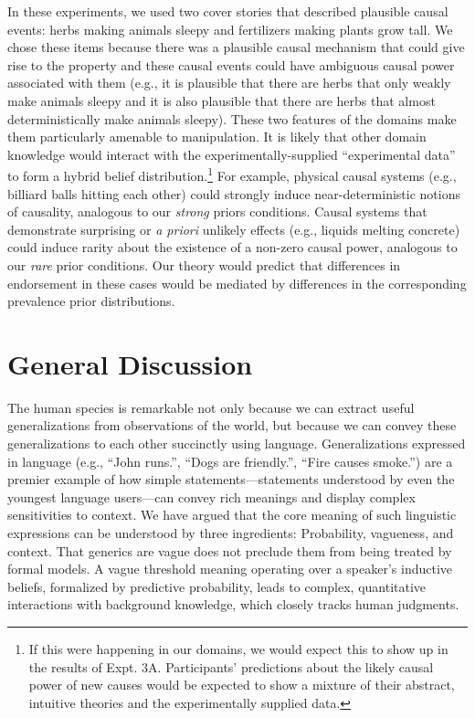 \documentclass[english,,man,floatsintext]{apa6}
\let\rmarkdownfootnote\footnote%
\def\footnote{\protect\rmarkdownfootnote}
\theoremstyle{definition}
\theoremstyle{definition}
\theoremstyle{definition}
\theoremstyle{remark}
\begin{document}
In these experiments, we used two cover stories that described plausible
causal events: herbs making animals sleepy and fertilizers making plants
grow tall. We chose these items because there was a plausible causal
mechanism that could give rise to the property and these causal events
could have ambiguous causal power associated with them (e.g., it is
plausible that there are herbs that only weakly make animals sleepy and
it is also plausible that there are herbs that almost deterministically
make animals sleepy). These two features of the domains make them
particularly amenable to manipulation. It is likely that other domain
knowledge would interact with the experimentally-supplied
\enquote{experimental data} to form a hybrid belief
distribution.\footnote{If this were happening in our domains, we would
  expect this to show up in the results of Expt. 3A. Participants'
  predictions about the likely causal power of new causes would be
  expected to show a mixture of their abstract, intuitive theories and
  the experimentally supplied data.} For example, physical causal
systems (e.g., billiard balls hitting each other) could strongly induce
near-deterministic notions of causality, analogous to our \emph{strong}
priors conditions. Causal systems that demonstrate surprising or \emph{a
priori} unlikely effects (e.g., liquids melting concrete) could induce
rarity about the existence of a non-zero causal power, analogous to our
\emph{rare} prior conditions. Our theory would predict that differences
in endorsement in these cases would be mediated by differences in the
corresponding prevalence prior distributions.

\hypertarget{general-discussion}{%
\section{General Discussion}\label{general-discussion}}

The human species is remarkable not only because we can extract useful
generalizations from observations of the world, but because we can
convey these generalizations to each other succinctly using language.
Generalizations expressed in language (e.g., \enquote{John runs.},
\enquote{Dogs are friendly.}, \enquote{Fire causes smoke.}) are a
premier example of how simple statements---statements understood by even
the youngest language users---can convey rich meanings and display
complex sensitivities to context. We have argued that the core meaning
of such linguistic expressions can be understood by three ingredients:
Probability, vagueness, and context. That generics are vague does not
preclude them from being treated by formal models. A vague threshold
meaning operating over a speaker's inductive beliefs, formalized by
predictive probability, leads to complex, quantitative interactions with
background knowledge, which closely tracks human judgments.
\end{document}
